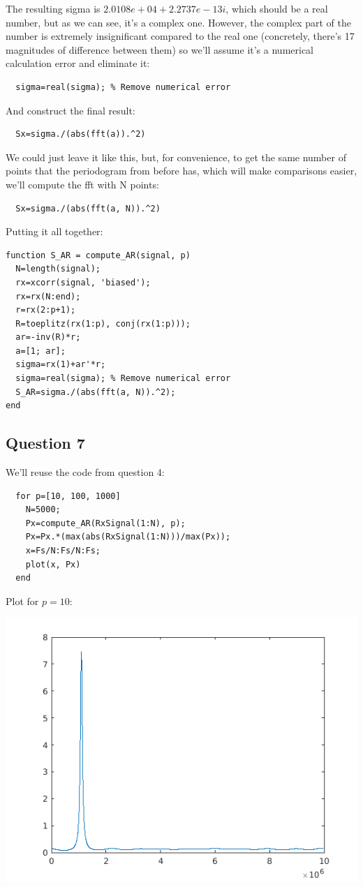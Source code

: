 \documentclass[conference,9pt]{IEEEtran}
\begin{document}
The resulting sigma is $2.0108e+04 + 2.2737e-13i$, which should be a real number, but as we can see, it's a complex one. However, the complex part of the number is extremely insignificant compared to the real one (concretely, there's 17 magnitudes of difference between them) so we'll assume it's a numerical calculation error and eliminate it:
\begin{verbatim}
  sigma=real(sigma); % Remove numerical error
\end{verbatim}

And construct the final result:
\begin{verbatim}
  Sx=sigma./(abs(fft(a)).^2)
\end{verbatim}

We could just leave it like this, but, for convenience, to get the same number of points that the periodogram from before has, which will make comparisons easier, we'll compute the fft with N points:
\begin{verbatim}
  Sx=sigma./(abs(fft(a, N)).^2)
\end{verbatim}

Putting it all together:
\begin{verbatim}
function S_AR = compute_AR(signal, p)
  N=length(signal);
  rx=xcorr(signal, 'biased');
  rx=rx(N:end);
  r=rx(2:p+1);
  R=toeplitz(rx(1:p), conj(rx(1:p)));
  ar=-inv(R)*r;
  a=[1; ar];
  sigma=rx(1)+ar'*r;
  sigma=real(sigma); % Remove numerical error
  S_AR=sigma./(abs(fft(a, N)).^2);
end
\end{verbatim}

\subsection{Question 7}
We'll reuse the code from question 4:
\begin{verbatim}
  for p=[10, 100, 1000]
    N=5000;
    Px=compute_AR(RxSignal(1:N), p);
    Px=Px.*(max(abs(RxSignal(1:N)))/max(Px));
    x=Fs/N:Fs/N:Fs;
    plot(x, Px)
  end
\end{verbatim}

\pagebreak

Plot for $p=10$:

\includegraphics[scale=0.6]{p10}
\end{document}
